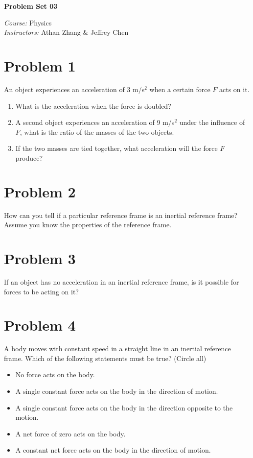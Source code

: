 \documentclass[tikz,border=10pt]{article}
\newcommand{\course}{Physics}
\newcommand{\instructor}{Athan Zhang \& Jeffrey Chen}
\begin{document}
\begin{center}
\textbf{\Huge Problem Set 03} %
\end{center}

\begin{flushleft}
\emph{Course:} \course \\
\emph{Instructors:} \instructor \\
\end{flushleft}

\section*{Problem 1}
An object experiences an acceleration of 3 m/s$^2$ when a certain force $F$ acts on it.
\begin{enumerate}
    \item What is the acceleration when the force is doubled?
    \item A second object experiences an acceleration of 9 m/s$^2$ under the influence of $F$, what is the ratio of the masses of the two objects. 
    \item If the two masses are tied together, what acceleration will the force $F$ produce?
\end{enumerate}

\section*{Problem 2}
How can you tell if a particular reference frame is an inertial reference frame? Assume you know the properties of the reference frame.

\section*{Problem 3}
If an object has no acceleration in an inertial reference frame, is it possible for forces to be acting on it?

\section*{Problem 4}
A body moves with constant speed in a straight line in an inertial reference frame. Which of the following statements must be true? (Circle all)
\begin{itemize}
    \item No force acts on the body.
    \item A single constant force acts on the body in the direction of motion.
    \item A single constant force acts on the body in the direction opposite to the motion.
    \item A net force of zero acts on the body.
    \item A constant net force acts on the body in the direction of motion.
\end{itemize}
\end{document}
